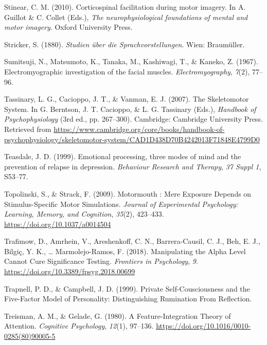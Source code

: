 \documentclass[a4paper,12pt,twoside,openright,oldfontcommands]{memoir}
\begin{document}
\leavevmode\hypertarget{ref-stinear_corticospinal_2010}{}%
Stinear, C. M. (2010). Corticospinal facilitation during motor imagery. In A. Guillot \& C. Collet (Eds.), \emph{The neurophysiological foundations of mental and motor imagery}. Oxford University Press.

\leavevmode\hypertarget{ref-stricker_studien_1880}{}%
Stricker, S. (1880). \emph{Studien über die Sprachvorstellungen}. Wien: Braumüller.

\leavevmode\hypertarget{ref-sumitsuji_electromyographic_1967}{}%
Sumitsuji, N., Matsumoto, K., Tanaka, M., Kashiwagi, T., \& Kaneko, Z. (1967). Electromyographic investigation of the facial muscles. \emph{Electromyography}, \emph{7}(2), 77--96.

\leavevmode\hypertarget{ref-berntson_skeletomotor_2007}{}%
Tassinary, L. G., Cacioppo, J. T., \& Vanman, E. J. (2007). The Skeletomotor System. In G. Berntson, J. T. Cacioppo, \& L. G. Tassinary (Eds.), \emph{Handbook of Psychophysiology} (3rd ed., pp. 267--300). Cambridge: Cambridge University Press. Retrieved from \url{https://www.cambridge.org/core/books/handbook-of-psychophysiology/skeletomotor-system/CAD1D438D70B4242013F71848E4799D0}

\leavevmode\hypertarget{ref-teasdale_emotional_1999}{}%
Teasdale, J. D. (1999). Emotional processing, three modes of mind and the prevention of relapse in depression. \emph{Behaviour Research and Therapy}, \emph{37 Suppl 1}, S53--77.

\leavevmode\hypertarget{ref-topolinski_motormouth_2009}{}%
Topolinski, S., \& Strack, F. (2009). Motormouth : Mere Exposure Depends on Stimulus-Specific Motor Simulations. \emph{Journal of Experimental Psychology: Learning, Memory, and Cognition}, \emph{35}(2), 423--433. \url{https://doi.org/10.1037/a0014504}

\leavevmode\hypertarget{ref-trafimow_manipulating_2018}{}%
Trafimow, D., Amrhein, V., Areshenkoff, C. N., Barrera-Causil, C. J., Beh, E. J., Bilgiç, Y. K., \ldots{} Marmolejo-Ramos, F. (2018). Manipulating the Alpha Level Cannot Cure Significance Testing. \emph{Frontiers in Psychology}, \emph{9}. \url{https://doi.org/10.3389/fpsyg.2018.00699}

\leavevmode\hypertarget{ref-trapnell_private_1999}{}%
Trapnell, P. D., \& Campbell, J. D. (1999). Private Self-Cousciousness and the Five-Factor Model of Personality: Distinguishing Rumination From Reflection.

\leavevmode\hypertarget{ref-treisman_feature-integration_1980}{}%
Treisman, A. M., \& Gelade, G. (1980). A Feature-Integration Theory of Attention. \emph{Cognitive Psychology}, \emph{12}(1), 97--136. \url{https://doi.org/10.1016/0010-0285(80)90005-5}
\end{document}

